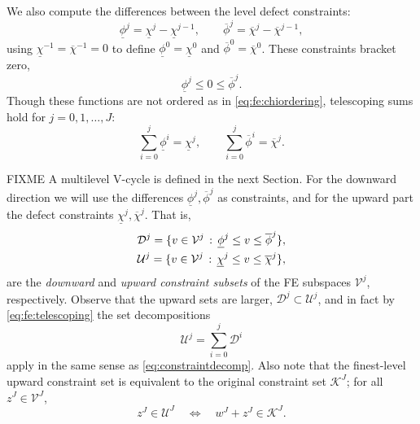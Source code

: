 \documentclass[letterpaper,final,12pt,reqno]{amsart}
\theoremstyle{cstyle}
\theoremstyle{cstyle*}
\theoremstyle{dstyle}
\numberwithin{equation}{section}
\numberwithin{figure}{section}
\numberwithin{table}{section}
\numberwithin{theorem}{section}
\begin{document}
We also compute the differences between the level defect constraints:
\begin{equation}
\underline{\phi}^j = \underline{\chi}^j - \underline{\chi}^{j-1}, \qquad \overline{\phi}^j = \overline{\chi}^j - \overline{\chi}^{j-1},  \label{eq:fe:philevels}
\end{equation}
using $\underline{\chi}^{-1}=\overline{\chi}^{-1}=0$ to define $\underline{\phi}^0=\underline{\chi}^0$ and $\overline{\phi}^0=\overline{\chi}^0$.  These constraints bracket zero,
\begin{equation}
\underline{\phi}^j \le 0 \le \overline{\phi}^j.  \label{eq:fe:phibrackets}
\end{equation}
Though these functions are not ordered as in \eqref{eq:fe:chiordering}, telescoping sums hold for $j=0,1,\dots,J$:
\begin{equation}
\sum_{i=0}^j \underline{\phi}^i = \underline{\chi}^j, \qquad \sum_{i=0}^j \overline{\phi}^i = \overline{\chi}^j.  \label{eq:fe:telescoping}
\end{equation}

FIXME A multilevel V-cycle is defined in the next Section.  For the downward direction we will use the differences $\underline{\phi}^j,\overline{\phi}^j$ as constraints, and for the upward part the defect constraints $\underline{\chi}^j,\overline{\chi}^j$.  That is,
\begin{align}
\mathcal{D}^j = \{v \in \mathcal{V}^j \,:\, \underline{\phi}^j \le v \le \overline{\phi}^j\}, \label{eq:fe:constraintsets} \\
\mathcal{U}^j = \{v \in \mathcal{V}^j \,:\, \underline{\chi}^j \le v \le \overline{\chi}^j\}, \notag
\end{align}
are the \emph{downward} and \emph{upward constraint subsets} of the FE subspaces $\mathcal{V}^j$, respectively.  Observe that the upward sets are larger, $\mathcal{D}^j \subset \mathcal{U}^j$, and in fact by \eqref{eq:fe:telescoping} the set decompositions
\begin{equation}
\mathcal{U}^j = \sum_{i=0}^j \mathcal{D}^i \label{eq:fe:constraintdecomp}
\end{equation}
apply in the same sense as \eqref{eq:constraintdecomp}.  Also note that the finest-level upward constraint set is equivalent to the original constraint set $\mathcal{K}^J$; for all $z^J \in \mathcal{V}^J$,
\begin{equation}
z^J \in \mathcal{U}^J \quad \iff \quad w^J+z^J \in \mathcal{K}^J. \label{eq:fe:finestlevelequivalent}
\end{equation}
\end{document}
